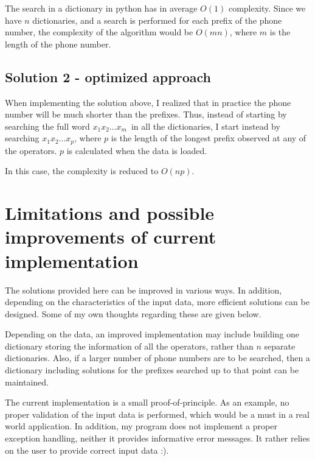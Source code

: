\documentclass[12pt]{article}
\begin{document}
\vspace{0.2cm}

The search in a dictionary in python has in average $O(1)$
complexity. Since we have $n$ dictionaries, and a search is performed
for each prefix of the phone number, the complexity of the algorithm
would be $O(mn)$, where $m$ is the length of the phone number.

\subsection{Solution 2 - optimized approach}
When implementing the solution above, I realized that in practice the
phone number will be much shorter than the prefixes. Thus, instead of
starting by searching the full word $x_1x_2 ... x_m$ in all the
dictionaries, I start instead by searching $x_1x_2 ...x_p$, where $p$
is the length of the longest prefix observed at any of the
operators. $p$ is calculated when the data is loaded.

\vspace{0.2cm}

In this case, the complexity is reduced to $O(np)$. 


\section{Limitations and possible improvements of current implementation}
The solutions provided here can be improved in various ways. In
addition, depending on the characteristics of the input data, more
efficient solutions can be designed. Some of my own thoughts regarding
these are given below. 

\vspace{0.2cm}

Depending on the data, an improved implementation may include building
one dictionary storing the information of all the operators, rather
than $n$ separate dictionaries. Also, if a larger number of phone
numbers are to be searched, then a dictionary including solutions for
the prefixes searched up to that point can be maintained. 

\vspace{0.2cm}

The current implementation is a small proof-of-principle. As an
example, no proper validation of the input data is performed, which
would be a must in a real world application. In addition, my program
does not implement a proper exception handling, neither it provides
informative error messages. It rather relies on the user to provide
correct input data :).
\end{document}
